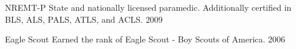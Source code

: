     \begin{cvhonors}

  \cvhonor
    {NREMT-P} %
    {State and nationally licensed paramedic. Additionally certified in BLS, ALS, PALS, ATLS, and ACLS.} %
    {}
    {2009} %

  \cvhonor
    {Eagle Scout} %
    {Earned the rank of Eagle Scout - Boy Scouts of America.} %
    {}
    {2006} %

\end{cvhonors}